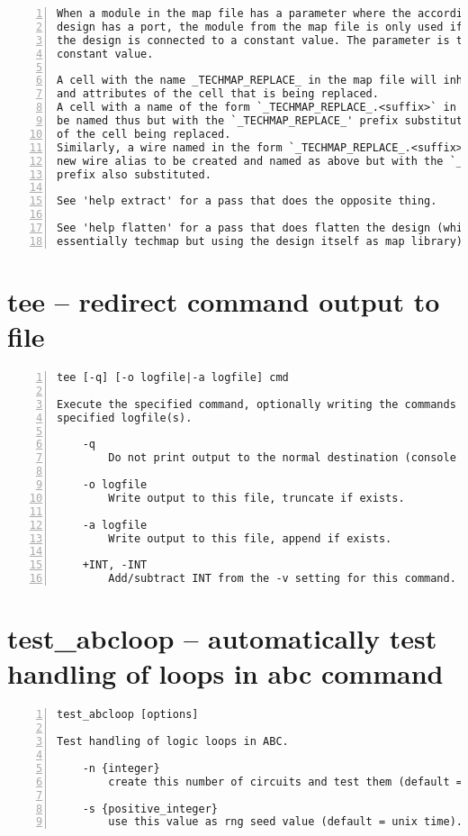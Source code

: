 \begin{lstlisting}[numbers=left,frame=single]
When a module in the map file has a parameter where the according cell in the
design has a port, the module from the map file is only used if the port in
the design is connected to a constant value. The parameter is then set to the
constant value.

A cell with the name _TECHMAP_REPLACE_ in the map file will inherit the name
and attributes of the cell that is being replaced.
A cell with a name of the form `_TECHMAP_REPLACE_.<suffix>` in the map file will
be named thus but with the `_TECHMAP_REPLACE_' prefix substituted with the name
of the cell being replaced.
Similarly, a wire named in the form `_TECHMAP_REPLACE_.<suffix>` will cause a
new wire alias to be created and named as above but with the `_TECHMAP_REPLACE_'
prefix also substituted.

See 'help extract' for a pass that does the opposite thing.

See 'help flatten' for a pass that does flatten the design (which is
essentially techmap but using the design itself as map library).
\end{lstlisting}

\section{tee -- redirect command output to file}
\label{cmd:tee}
\begin{lstlisting}[numbers=left,frame=single]
    tee [-q] [-o logfile|-a logfile] cmd

Execute the specified command, optionally writing the commands output to the
specified logfile(s).

    -q
        Do not print output to the normal destination (console and/or log file).

    -o logfile
        Write output to this file, truncate if exists.

    -a logfile
        Write output to this file, append if exists.

    +INT, -INT
        Add/subtract INT from the -v setting for this command.
\end{lstlisting}

\section{test\_abcloop -- automatically test handling of loops in abc command}
\label{cmd:test_abcloop}
\begin{lstlisting}[numbers=left,frame=single]
    test_abcloop [options]

Test handling of logic loops in ABC.

    -n {integer}
        create this number of circuits and test them (default = 100).

    -s {positive_integer}
        use this value as rng seed value (default = unix time).
\end{lstlisting}

